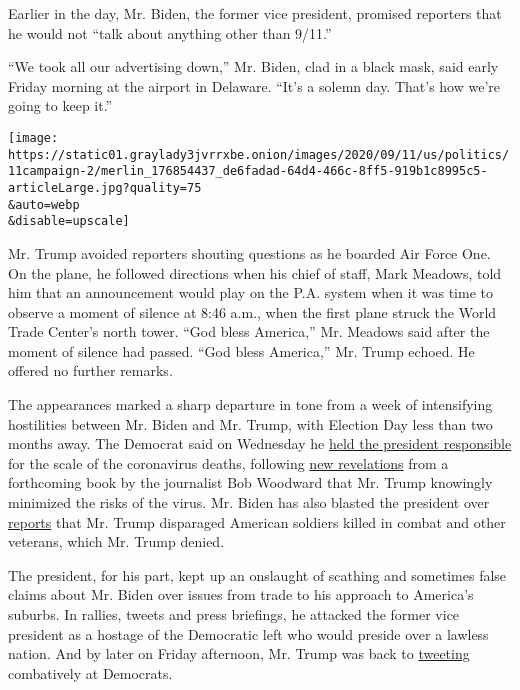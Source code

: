 Earlier in the day, Mr. Biden, the former vice president, promised
reporters that he would not ``talk about anything other than 9/11.''

``We took all our advertising down,'' Mr. Biden, clad in a black mask,
said early Friday morning at the airport in Delaware. ``It's a solemn
day. That's how we're going to keep it.''

\texttt{[image: https://static01.graylady3jvrrxbe.onion/images/2020/09/11/us/politics/11campaign-2/merlin\_176854437\_de6fadad-64d4-466c-8ff5-919b1c8995c5-articleLarge.jpg?quality=75\\\&auto=webp\\\&disable=upscale]}

Mr. Trump avoided reporters shouting questions as he boarded Air Force
One. On the plane, he followed directions when his chief of staff, Mark
Meadows, told him that an announcement would play on the P.A. system
when it was time to observe a moment of silence at 8:46 a.m., when the
first plane struck the World Trade Center's north tower. ``God bless
America,'' Mr. Meadows said after the moment of silence had passed.
``God bless America,'' Mr. Trump echoed. He offered no further remarks.

The appearances marked a sharp departure in tone from a week of
intensifying hostilities between Mr. Biden and Mr. Trump, with Election
Day less than two months away. The Democrat said on Wednesday he
\href{https://www.nytimes3xbfgragh.onion/2020/09/09/us/politics/biden-trump-michigan-jobs-taxes.html}{held
the president responsible} for the scale of the coronavirus deaths,
following
\href{https://www.nytimes3xbfgragh.onion/live/2020/09/09/us/trump-vs-biden/trump-admitted-to-bob-woodward-that-he-intentionally-played-down-the-threat-of-the-coronavirus}{new
revelations} from a forthcoming book by the journalist Bob Woodward that
Mr. Trump knowingly minimized the risks of the virus. Mr. Biden has also
blasted the president over
\href{https://www.theatlantic.com/politics/archive/2020/09/trump-americans-who-died-at-war-are-losers-and-suckers/615997/}{reports}
that Mr. Trump disparaged American soldiers killed in combat and other
veterans, which Mr. Trump denied.

The president, for his part, kept up an onslaught of scathing and
sometimes false claims about Mr. Biden over issues from trade to his
approach to America's suburbs. In rallies, tweets and press briefings,
he attacked the former vice president as a hostage of the Democratic
left who would preside over a lawless nation. And by later on Friday
afternoon, Mr. Trump was back to
\href{https://twitter.com/realDonaldTrump/status/1304511871152795650?s=20}{tweeting}
combatively at Democrats.

